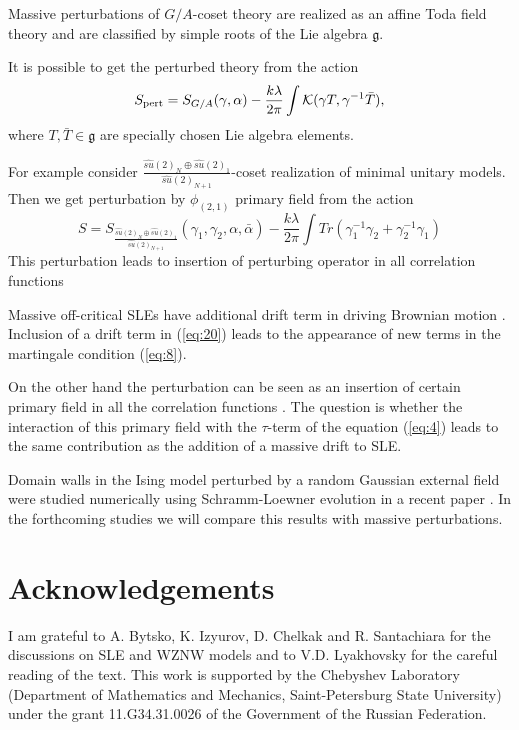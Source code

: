 \documentclass{jetpl}
\newcommand{\gf}{\mathfrak{g}}
\begin{document}
Massive perturbations of $G/A$-coset theory are realized as an affine Toda field theory and are classified by simple roots of the Lie algebra $\gf$. 

It is possible to get the perturbed theory from the action \cite{bakas1996lagrangian,hollowood1995massive,park1994deformed}
\begin{equation}
  S_{\text{pert}}=S_{G/A}(\gamma,\alpha)-\frac{k\lambda}{2\pi}\int {\cal K} (\gamma T, \gamma^{-1} \bar T),
\end{equation}
where $T,\bar T\in \gf$ are specially chosen Lie algebra elements. 

For example consider  $\frac{\hat{su}(2)_{N}\oplus \hat{su}(2)_{1}}{\hat{su}(2)_{N+1}}$-coset realization of minimal unitary models. Then we get perturbation by $\phi_{(2,1)}$ primary field from the action
\begin{equation}
  S=S_{\frac{\hat{su}(2)_{N}\oplus \hat{su}(2)_{1}}{\hat{su}(2)_{N+1}}} (\gamma_1,\gamma_2,\alpha,\bar \alpha) - \frac{k\lambda}{2\pi}\int Tr(\gamma_1^{-1} \gamma_2+\gamma_2^{-1}\gamma_1)
\end{equation}
This perturbation leads to insertion of perturbing operator in all correlation functions 

Massive off-critical SLEs have additional drift term in driving Brownian motion \cite{makarov2010off,bauer2009off}. Inclusion of a drift term in (\ref{eq:20}) leads to the  appearance of new terms in the martingale condition (\ref{eq:8}).

On the other hand the perturbation can be seen as an insertion of certain primary field in all the correlation functions \cite{hollowood1989rational}. The question is whether the interaction of this primary field with the $\tau$-term of the equation (\ref{eq:4}) leads to the same contribution as the addition of a massive drift to SLE.

Domain walls in the Ising model perturbed by a random Gaussian external field were studied numerically using Schramm-Loewner evolution in a recent paper \cite{stevenson2011domain}. In the forthcoming studies we will compare this results with massive perturbations.


\section*{Acknowledgements}
\label{sec:acknowledgements}
 I am grateful to A. Bytsko, K. Izyurov, D. Chelkak and R. Santachiara for the discussions on SLE and WZNW models and to V.D. Lyakhovsky for the careful reading of the text.  This work  is supported by
the Chebyshev Laboratory (Department of Mathematics and Mechanics,
Saint-Petersburg State University) under the grant 11.G34.31.0026
of the Government of the Russian Federation.
\end{document}
